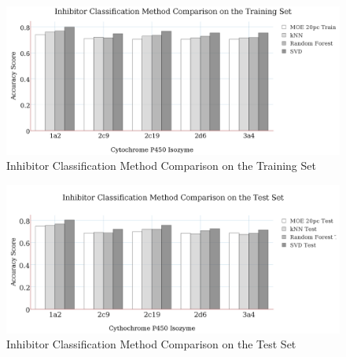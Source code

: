 \begin{figure}[!h]
\includegraphics[width=1\textwidth]{../img/method_comparison_training_set.png}
\caption{Inhibitor Classification Method Comparison on the Training Set}
\end{figure}

\begin{figure}[!h]
\includegraphics[width=1\textwidth]{../img/method_comparison_test_set.png}
\caption{Inhibitor Classification Method Comparison on the Test Set}
\end{figure}






